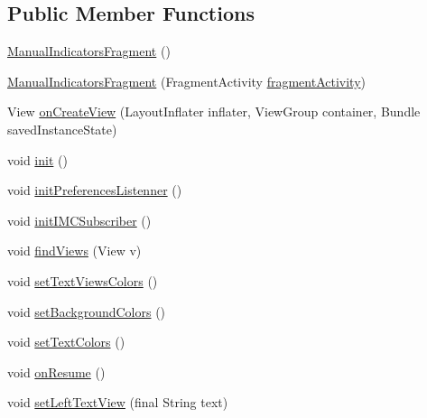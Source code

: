 \subsection*{Public Member Functions}
\begin{DoxyCompactItemize}
\item 
\hyperlink{classpt_1_1lsts_1_1asa_1_1fragments_1_1ManualIndicatorsFragment_a51c7a38228651d2377e1414fe2a27ff1}{Manual\+Indicators\+Fragment} ()
\item 
\hyperlink{classpt_1_1lsts_1_1asa_1_1fragments_1_1ManualIndicatorsFragment_a3bc5363475cf6b0534965c5d391170d4}{Manual\+Indicators\+Fragment} (Fragment\+Activity \hyperlink{classpt_1_1lsts_1_1asa_1_1fragments_1_1ManualIndicatorsFragment_a1cb79f4c38ab9a703b46652568dc984d}{fragment\+Activity})
\item 
View \hyperlink{classpt_1_1lsts_1_1asa_1_1fragments_1_1ManualIndicatorsFragment_a557a580fbaef383c6e91474c4ffaaaab}{on\+Create\+View} (Layout\+Inflater inflater, View\+Group container, Bundle saved\+Instance\+State)
\item 
void \hyperlink{classpt_1_1lsts_1_1asa_1_1fragments_1_1ManualIndicatorsFragment_a992b70c253dc6403a7f29492e4ed8bf6}{init} ()
\item 
void \hyperlink{classpt_1_1lsts_1_1asa_1_1fragments_1_1ManualIndicatorsFragment_a679b000827db94319eb945b081de0078}{init\+Preferences\+Listenner} ()
\item 
void \hyperlink{classpt_1_1lsts_1_1asa_1_1fragments_1_1ManualIndicatorsFragment_a9128f597a78e2016cb6f37e3093e8264}{init\+I\+M\+C\+Subscriber} ()
\item 
void \hyperlink{classpt_1_1lsts_1_1asa_1_1fragments_1_1ManualIndicatorsFragment_ab2954534c6738ca73b37ab90ad5cd9ff}{find\+Views} (View v)
\item 
void \hyperlink{classpt_1_1lsts_1_1asa_1_1fragments_1_1ManualIndicatorsFragment_a2a179235efd25d578763f9f2408e316b}{set\+Text\+Views\+Colors} ()
\item 
void \hyperlink{classpt_1_1lsts_1_1asa_1_1fragments_1_1ManualIndicatorsFragment_a6f1bf23dd26e22e51030ca8f1100866b}{set\+Background\+Colors} ()
\item 
void \hyperlink{classpt_1_1lsts_1_1asa_1_1fragments_1_1ManualIndicatorsFragment_aaa594cc4d3d19a9122d1024da4fbf51b}{set\+Text\+Colors} ()
\item 
void \hyperlink{classpt_1_1lsts_1_1asa_1_1fragments_1_1ManualIndicatorsFragment_a8d743e5232f8d44faa9ff533c1ddc668}{on\+Resume} ()
\item 
void \hyperlink{classpt_1_1lsts_1_1asa_1_1fragments_1_1ManualIndicatorsFragment_afc16a979bd8c78dc10af81c8a0448422}{set\+Left\+Text\+View} (final String text)

\end{DoxyCompactItemize}
